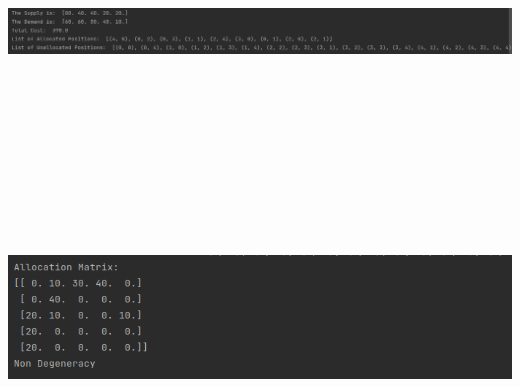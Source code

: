 \documentclass[12pt, letterpaper, twoside]{book}
\begin{document}
\includegraphics[height=200pt,width=550pt]{Output3}

\includegraphics[height=200pt,width=550pt]{Output4}
\end{document}
